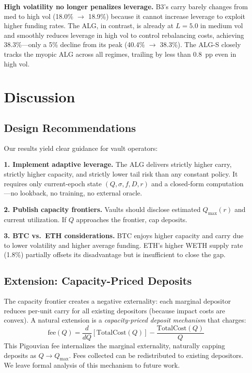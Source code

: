 \documentclass[11pt]{article}
\begin{document}
\textbf{High volatility no longer penalizes leverage.} B3's carry barely changes from med to high vol (18.0\% $\to$ 18.9\%) because it cannot increase leverage to exploit higher funding rates. The ALG, in contrast, is already at $L = 5.0$ in medium vol and smoothly reduces leverage in high vol to control rebalancing costs, achieving 38.3\%---only a 5\% decline from its peak (40.4\% $\to$ 38.3\%). The ALG-S closely tracks the myopic ALG across all regimes, trailing by less than 0.8~pp even in high vol.

\section{Discussion}

\subsection{Design Recommendations}

Our results yield clear guidance for vault operators:

\textbf{1. Implement adaptive leverage.} The ALG delivers strictly higher carry, strictly higher capacity, and strictly lower tail risk than any constant policy. It requires only current-epoch state $(Q, \sigma, f, D, r)$ and a closed-form computation---no lookback, no training, no external oracle.

\textbf{2. Publish capacity frontiers.} Vaults should disclose estimated $Q_{\max}(r)$ and current utilization. If $Q$ approaches the frontier, cap deposits.

\textbf{3. BTC vs.\ ETH considerations.} BTC enjoys higher capacity and carry due to lower volatility and higher average funding. ETH's higher WETH supply rate (1.8\%) partially offsets its disadvantage but is insufficient to close the gap.

\subsection{Extension: Capacity-Priced Deposits}

The capacity frontier creates a negative externality: each marginal depositor reduces per-unit carry for all existing depositors (because impact costs are convex). A natural extension is a \textit{capacity-priced deposit mechanism} that charges:
\[
\text{fee}(Q) = \frac{d}{dQ}\left[\text{TotalCost}(Q)\right] - \frac{\text{TotalCost}(Q)}{Q}
\]
This Pigouvian fee internalizes the marginal externality, naturally capping deposits as $Q \to Q_{\max}$. Fees collected can be redistributed to existing depositors. We leave formal analysis of this mechanism to future work.
\end{document}
